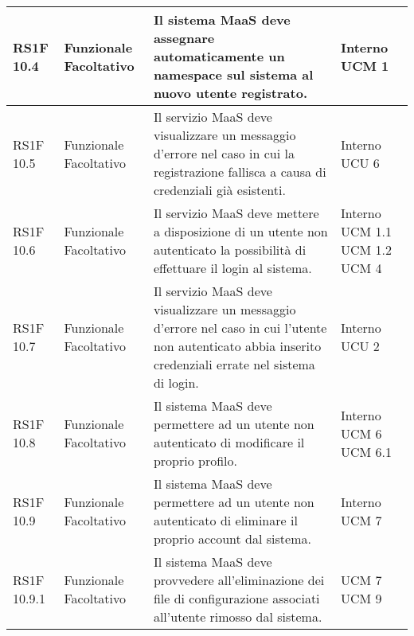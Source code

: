 \begin{center}
\begin{longtable}{ | l | p{2cm} | p{5cm} | p{1.7cm} |}
				RS1F 10.4 & Funzionale \newline  Facoltativo  & Il sistema MaaS deve assegnare automaticamente un namespace sul sistema al nuovo utente registrato. &  Interno \newline  UCM 1 \newline  \\ \hline      
				RS1F 10.5 & Funzionale \newline  Facoltativo  & Il servizio MaaS deve visualizzare un messaggio d’errore nel caso in cui la registrazione fallisca a causa di credenziali già esistenti. &  Interno \newline  UCU 6 \newline  \\ \hline      
				RS1F 10.6 & Funzionale \newline  Facoltativo  & Il servizio MaaS deve mettere a disposizione di un utente non autenticato la possibilità di effettuare il login al sistema. &  Interno \newline  UCM 1.1 \newline  UCM 1.2 \newline  UCM 4 \newline  \\ \hline      
				RS1F 10.7 & Funzionale \newline  Facoltativo  & Il servizio MaaS deve visualizzare un messaggio d’errore nel caso in cui l’utente non autenticato abbia inserito credenziali errate nel sistema di login. &  Interno \newline  UCU 2 \newline  \\ \hline      
				RS1F 10.8 & Funzionale \newline  Facoltativo  & Il sistema MaaS deve permettere ad un utente non autenticato di modificare il proprio profilo. &  Interno \newline  UCM 6 \newline  UCM 6.1 \newline  \\ \hline      
				RS1F 10.9 & Funzionale \newline  Facoltativo  & Il sistema MaaS deve permettere ad un utente non autenticato di eliminare il proprio account dal sistema. &  Interno \newline  UCM 7 \newline  \\ \hline      
				RS1F 10.9.1 & Funzionale \newline  Facoltativo  & Il sistema MaaS deve provvedere all’eliminazione dei file di configurazione associati all’utente rimosso dal sistema. &  UCM 7 \newline  UCM 9 \newline  \\ \hline      

\end{longtable}
\end{center}
